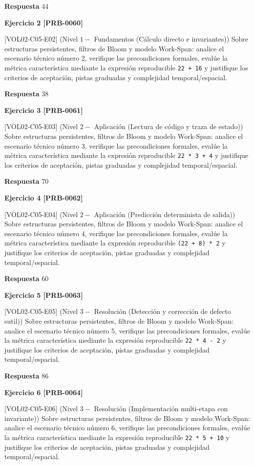 \documentclass{book}
\begin{document}
\noindent\textbf{Respuesta} 44

\noindent\textbf{Ejercicio 2 [PRB-0060]}

[VOL02-C05-E02] (Nivel \(1 -\) Fundamentos (Cálculo directo e invariantes)) Sobre estructuras persistentes, filtros de Bloom y modelo Work-Span: analice el escenario técnico número 2, verifique las precondiciones formales, evalúe la métrica característica mediante la expresión reproducible \texttt{22 + 16} y justifique los criterios de aceptación, pistas graduadas y complejidad temporal/espacial.

\noindent\textbf{Respuesta} 38

\noindent\textbf{Ejercicio 3 [PRB-0061]}

[VOL02-C05-E03] (Nivel \(2 -\) Aplicación (Lectura de código y traza de estado)) Sobre estructuras persistentes, filtros de Bloom y modelo Work-Span: analice el escenario técnico número 3, verifique las precondiciones formales, evalúe la métrica característica mediante la expresión reproducible \texttt{22 * 3 + 4} y justifique los criterios de aceptación, pistas graduadas y complejidad temporal/espacial.

\noindent\textbf{Respuesta} 70

\noindent\textbf{Ejercicio 4 [PRB-0062]}

[VOL02-C05-E04] (Nivel \(2 -\) Aplicación (Predicción determinista de salida)) Sobre estructuras persistentes, filtros de Bloom y modelo Work-Span: analice el escenario técnico número 4, verifique las precondiciones formales, evalúe la métrica característica mediante la expresión reproducible \texttt{(22 + 8) * 2} y justifique los criterios de aceptación, pistas graduadas y complejidad temporal/espacial.

\noindent\textbf{Respuesta} 60

\noindent\textbf{Ejercicio 5 [PRB-0063]}

[VOL02-C05-E05] (Nivel \(3 -\) Resolución (Detección y corrección de defecto sutil)) Sobre estructuras persistentes, filtros de Bloom y modelo Work-Span: analice el escenario técnico número 5, verifique las precondiciones formales, evalúe la métrica característica mediante la expresión reproducible \texttt{22 * 4 - 2} y justifique los criterios de aceptación, pistas graduadas y complejidad temporal/espacial.

\noindent\textbf{Respuesta} 86

\noindent\textbf{Ejercicio 6 [PRB-0064]}

[VOL02-C05-E06] (Nivel \(3 -\) Resolución (Implementación multi-etapa con invariante)) Sobre estructuras persistentes, filtros de Bloom y modelo Work-Span: analice el escenario técnico número 6, verifique las precondiciones formales, evalúe la métrica característica mediante la expresión reproducible \texttt{22 * 5 + 10} y justifique los criterios de aceptación, pistas graduadas y complejidad temporal/espacial.
\end{document}
